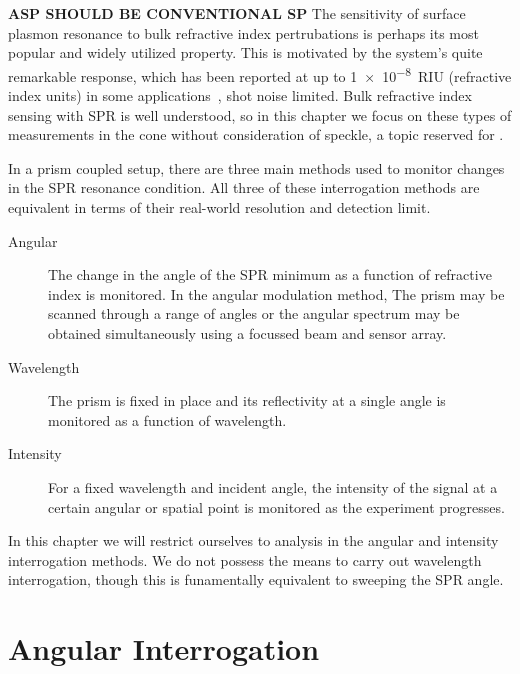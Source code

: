 \textbf{ASP SHOULD BE CONVENTIONAL SP}
The sensitivity of surface plasmon resonance to bulk refractive index
pertrubations is perhaps its most popular and widely utilized property.
This is motivated by the system's quite remarkable response, which has been
reported at up to \SI{1e-8}{RIU} (refractive index units) in some
applications~\cite{sprreview}, shot noise limited.  Bulk refractive index
sensing with SPR is well understood, so in this chapter we focus on these
types of measurements in the cone without consideration of speckle, a topic
reserved for .  

In a prism coupled setup, there are three main methods used to
monitor changes in the SPR resonance condition.  All three of these
interrogation methods are equivalent in terms of their real-world
resolution and detection limit.~\cite{pines1952collective}
\begin{description}
	\item [{Angular}] The change in the angle of the SPR minimum as a function
					of refractive index is monitored.  In the angular modulation method,
					The prism may be scanned through a range of angles or the angular
					spectrum may be obtained simultaneously using a focussed beam and
					sensor array.
 \item [{Wavelength}] The prism is fixed in place and its reflectivity at
  a single angle is monitored as a function of wavelength.
	\item [{Intensity}] For a fixed wavelength and incident angle, the
		intensity of the signal at a certain angular or spatial point is
		monitored as the experiment progresses.
\end{description}

In this chapter we will restrict ourselves to analysis in the angular and
intensity interrogation methods.  We do not possess the means to carry out
wavelength interrogation, though this is funamentally equivalent to
sweeping the SPR angle. 

\section{Angular Interrogation}

